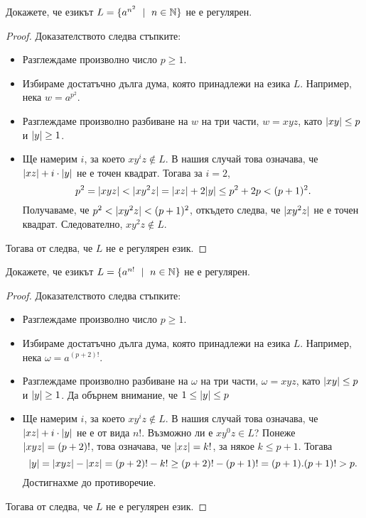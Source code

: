 \begin{problem}
  Докажете, че езикът $L = \{a^{n^2}\ \mid\ n\in\Nat\}$ не е регулярен.  
\end{problem}
\begin{proof}
  Доказателството следва стъпките:
  \begin{itemize}
  \item 
    Разглеждаме произволно число $p \geq 1$.
  \item
    Избираме достатъчно дълга дума, която принадлежи на езика $L$.
    Например, нека $w = a^{p^2}$.
  \item
    Разглеждаме произволно разбиване на $w$ на три части, $w = xyz$, 
    като $\lvert{xy}\rvert \leq p$ и $\lvert{y}\rvert \geq 1$.
  \item
    Ще намерим $i$, за което $xy^iz \not\in L$.
    В нашия случай това означава, че $\lvert{xz}\rvert + i\cdot\lvert{y}\rvert$ не е точен квадрат.
    Тогава за $i = 2$,
    \[p^2 = \lvert{xyz}\rvert < \lvert{xy^2z}\rvert = \lvert{xz}\rvert + 2\lvert{y}\rvert \leq p^2 + 2p < (p+1)^2 .\]
    Получаваме, че $p^2 < \lvert{xy^2z}\rvert < (p+1)^2$,
    откъдето следва, че $\lvert{xy^2z}\rvert$ не е точен квадрат.
    Следователно, $xy^2z \not\in L$.
  \end{itemize}
  Тогава от  следва, че $L$ не е регулярен език.  
\end{proof}

\begin{problem}
  Докажете, че езикът $L = \{a^{n!}\ \mid\ n\in\Nat\}$ не е регулярен.  
\end{problem}
\begin{proof}
  Доказателството следва стъпките:
  \begin{itemize}
  \item 
    Разглеждаме произволно число $p \geq 1$.
  \item
    Избираме достатъчно дълга дума, която принадлежи на езика $L$. Например, нека $\omega = a^{(p+2)!}$.
  \item
    Разглеждаме произволно разбиване на $\omega$ на три части, $\omega = xyz$, 
    като $\lvert{xy}\rvert \leq p$ и $\lvert{y}\rvert \geq 1$.
    Да обърнем внимание, че $1 \leq \lvert{y}\rvert \leq p$
  \item
    Ще намерим $i$, за което $xy^iz \not\in L$.
    В нашия случай това означава, че $\lvert{xz}\rvert + i\cdot\lvert{y}\rvert$ не е от вида $n!$.
    Възможно ли е $xy^0z \in L$?
    Понеже $\lvert{xyz}\rvert = (p+2)!$, това означава, че $\lvert{xz}\rvert = k!$, за някое $k \leq p+1$.
    Тогава 
    \[\lvert{y}\rvert = \lvert{xyz}\rvert - \lvert{xz}\rvert = (p+2)! - k! \geq (p+2)! - (p+1)! = (p+1).(p+1)! > p.\]
    Достигнахме до противоречие.
  \end{itemize}
  Тогава от  следва, че $L$ не е регулярен език.  
\end{proof}

